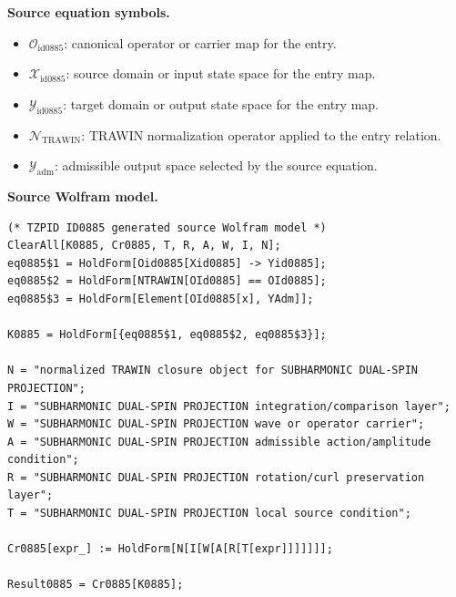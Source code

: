 \begin{minipage}[t]{0.49\linewidth}
\begingroup
\small
\raggedright
\textbf{Source equation symbols.}\par
\begin{itemize}[leftmargin=1.35em,itemsep=1pt,topsep=1pt,parsep=0pt]
    \item $\mathcal{O}_{\mathrm{id0885}}$: canonical operator or carrier map for the entry.
    \item $\mathcal{X}_{\mathrm{id0885}}$: source domain or input state space for the entry map.
    \item $\mathcal{Y}_{\mathrm{id0885}}$: target domain or output state space for the entry map.
    \item $\mathcal{N}_{\mathrm{TRAWIN}}$: TRAWIN normalization operator applied to the entry relation.
    \item $\mathcal{Y}_{\mathrm{adm}}$: admissible output space selected by the source equation.
\end{itemize}
\endgroup
\end{minipage}\hfill
\begin{minipage}[t]{0.47\linewidth}
\begingroup
\scriptsize
\raggedright
\textbf{Source Wolfram model.}\par
\begin{Verbatim}[fontsize=\tiny,breaklines=true,breakanywhere=true]
(* TZPID ID0885 generated source Wolfram model *)
ClearAll[K0885, Cr0885, T, R, A, W, I, N];
eq0885$1 = HoldForm[Oid0885[Xid0885] -> Yid0885];
eq0885$2 = HoldForm[NTRAWIN[OId0885] == OId0885];
eq0885$3 = HoldForm[Element[OId0885[x], YAdm]];

K0885 = HoldForm[{eq0885$1, eq0885$2, eq0885$3}];

N = "normalized TRAWIN closure object for SUBHARMONIC DUAL-SPIN PROJECTION";
I = "SUBHARMONIC DUAL-SPIN PROJECTION integration/comparison layer";
W = "SUBHARMONIC DUAL-SPIN PROJECTION wave or operator carrier";
A = "SUBHARMONIC DUAL-SPIN PROJECTION admissible action/amplitude condition";
R = "SUBHARMONIC DUAL-SPIN PROJECTION rotation/curl preservation layer";
T = "SUBHARMONIC DUAL-SPIN PROJECTION local source condition";

Cr0885[expr_] := HoldForm[N[I[W[A[R[T[expr]]]]]]];

Result0885 = Cr0885[K0885];
\end{Verbatim}
\endgroup
\end{minipage}

